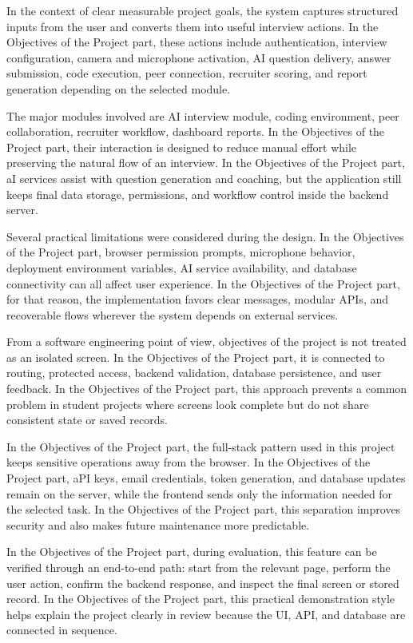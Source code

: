 \documentclass[12pt,a4paper]{report}
\begin{document}
In the context of clear measurable project goals, the system captures structured inputs from the user and converts them into useful interview actions. In the Objectives of the Project part, these actions include authentication, interview configuration, camera and microphone activation, AI question delivery, answer submission, code execution, peer connection, recruiter scoring, and report generation depending on the selected module.


The major modules involved are AI interview module, coding environment, peer collaboration, recruiter workflow, dashboard reports. In the Objectives of the Project part, their interaction is designed to reduce manual effort while preserving the natural flow of an interview. In the Objectives of the Project part, aI services assist with question generation and coaching, but the application still keeps final data storage, permissions, and workflow control inside the backend server.


Several practical limitations were considered during the design. In the Objectives of the Project part, browser permission prompts, microphone behavior, deployment environment variables, AI service availability, and database connectivity can all affect user experience. In the Objectives of the Project part, for that reason, the implementation favors clear messages, modular APIs, and recoverable flows wherever the system depends on external services.


From a software engineering point of view, objectives of the project is not treated as an isolated screen. In the Objectives of the Project part, it is connected to routing, protected access, backend validation, database persistence, and user feedback. In the Objectives of the Project part, this approach prevents a common problem in student projects where screens look complete but do not share consistent state or saved records.


In the Objectives of the Project part, the full-stack pattern used in this project keeps sensitive operations away from the browser. In the Objectives of the Project part, aPI keys, email credentials, token generation, and database updates remain on the server, while the frontend sends only the information needed for the selected task. In the Objectives of the Project part, this separation improves security and also makes future maintenance more predictable.


In the Objectives of the Project part, during evaluation, this feature can be verified through an end-to-end path: start from the relevant page, perform the user action, confirm the backend response, and inspect the final screen or stored record. In the Objectives of the Project part, this practical demonstration style helps explain the project clearly in review because the UI, API, and database are connected in sequence.
\end{document}
